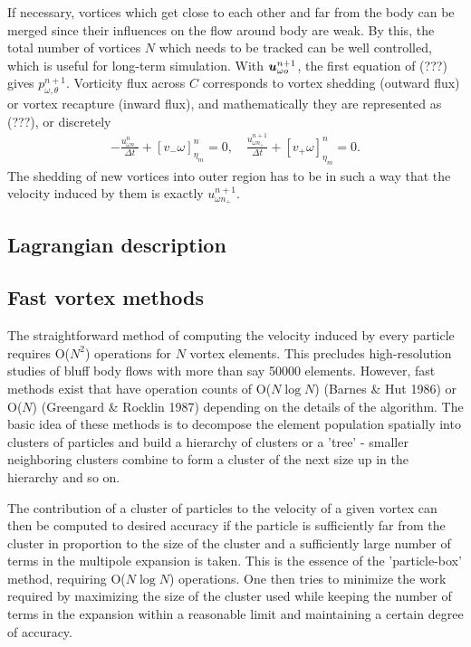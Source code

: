 If necessary, vortices which get close to each other and far from the body can be merged since their influences on the flow around body are weak.
By this, the total number of vortices $N$ which needs to be tracked can be well controlled, which is useful for long-term simulation.
With $\boldsymbol{u}_{\omega o}^{n+1}$, the first equation of (???) gives $p_{\omega,\theta}^{n+1}$.
Vorticity flux across $C$ corresponds to vortex shedding (outward flux) or vortex recapture (inward flux), and mathematically they are represented as (???), or discretely
\begin{align} \label{eqn:vorticityflux}
-\frac{u_{\omega n_-}^n}{\Delta t} + [v_- \omega]_{\eta_m}^n = 0, \quad
\frac{u_{\omega n_+}^{n+1}}{\Delta t} + [v_+ \omega]_{\eta_m}^n = 0.
\end{align}
The shedding of new vortices into outer region has to be in such a way that the velocity induced by them is exactly $u_{\omega n_+}^{n+1}$.

\subsection{Lagrangian description}

\subsection{Fast vortex methods}
The straightforward method of computing the velocity induced by every particle requires O($N^2$) operations for $N$ vortex elements.
This precludes high-resolution studies of bluff body flows with more than say 50000 elements.
However, fast methods exist that have operation counts of O($N\log N$)  (Barnes \& Hut 1986) or O($N$) (Greengard \& Rocklin 1987) depending on the details of the algorithm.
The basic idea of these methods is to decompose the element population spatially into clusters of particles and build a hierarchy of clusters or a 'tree' - smaller neighboring clusters combine to form a cluster of the next size up in the hierarchy and so on.

The contribution of a cluster of particles to the velocity of a given vortex can then be computed to desired accuracy if the particle is sufficiently far from the cluster in proportion to the size of the cluster and a sufficiently large number of terms in the multipole expansion is taken.
This is the essence of the 'particle-box' method, requiring O($N\log N$) operations.
One then tries to minimize the work required by maximizing the size of the cluster used while keeping the number of terms in the expansion within a reasonable limit and maintaining a certain degree of accuracy.

